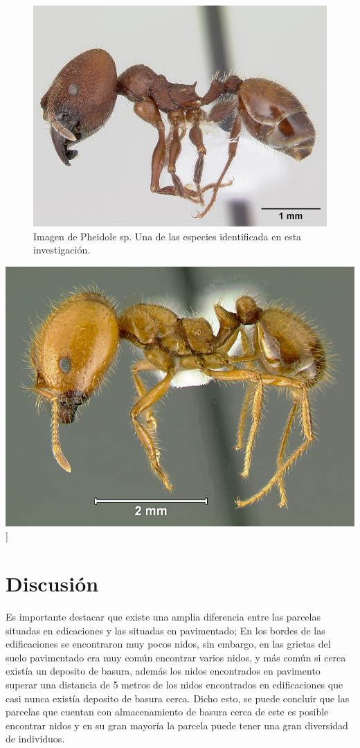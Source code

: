 \documentclass[11pt,]{article}
\begin{document}
\begin{figure}
\centering
\includegraphics{pheidole.jpg}
\caption{Imagen de Pheidole sp. Una de las especies identificada en esta
investigación.}
\end{figure}

\includegraphics{solenopsis.jpg} {]}

\section{Discusión}\label{discusiuxf3n}

Es importante destacar que existe una amplia diferencia entre las
parcelas situadas en edicaciones y las situadas en pavimentado; En los
bordes de las edificaciones se encontraron muy pocos nidos, sin embargo,
en las grietas del suelo pavimentado era muy común encontrar varios
nidos, y más común si cerca existía un deposito de basura, además los
nidos encontrados en pavimento superar una distancia de 5 metros de los
nidos encontrados en edificaciones que casi nunca existía deposito de
basura cerca. Dicho esto, se puede concluir que las parcelas que cuentan
con almacenamiento de basura cerca de este es posible encontrar nidos y
en su gran mayoría la parcela puede tener una gran diversidad de
individuos.
\end{document}
